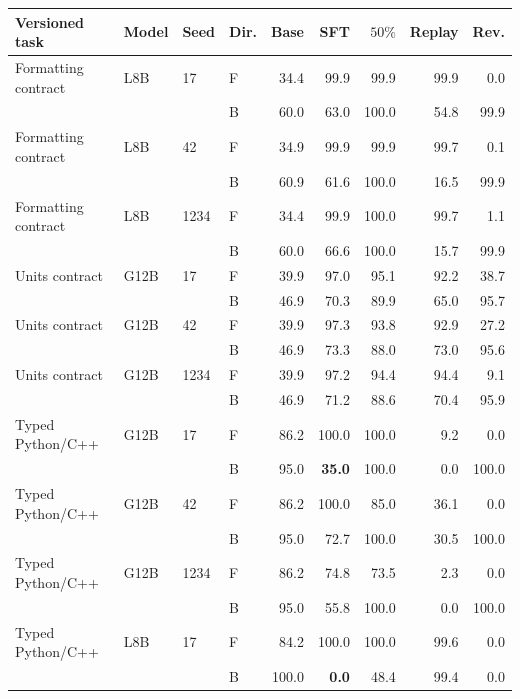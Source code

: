 \begin{table}[t]
\centering\footnotesize
\setlength{\tabcolsep}{5pt}
\begin{tabular}{lll lrrrrr}
\toprule
Versioned task & Model & Seed & Dir. & Base & SFT & $50\%$ & Replay & Rev. \\
\midrule
Formatting contract & L8B & 17 & F & 34.4 & 99.9 & 99.9 & 99.9 & 0.0 \\
 &  &  & B & 60.0 & 63.0 & 100.0 & 54.8 & 99.9 \\
\addlinespace[2pt]
Formatting contract & L8B & 42 & F & 34.9 & 99.9 & 99.9 & 99.7 & 0.1 \\
 &  &  & B & 60.9 & 61.6 & 100.0 & 16.5 & 99.9 \\
\addlinespace[2pt]
Formatting contract & L8B & 1234 & F & 34.4 & 99.9 & 100.0 & 99.7 & 1.1 \\
 &  &  & B & 60.0 & 66.6 & 100.0 & 15.7 & 99.9 \\
\addlinespace[2pt]
Units contract & G12B & 17 & F & 39.9 & 97.0 & 95.1 & 92.2 & 38.7 \\
 &  &  & B & 46.9 & 70.3 & 89.9 & 65.0 & 95.7 \\
\addlinespace[2pt]
Units contract & G12B & 42 & F & 39.9 & 97.3 & 93.8 & 92.9 & 27.2 \\
 &  &  & B & 46.9 & 73.3 & 88.0 & 73.0 & 95.6 \\
\addlinespace[2pt]
Units contract & G12B & 1234 & F & 39.9 & 97.2 & 94.4 & 94.4 & 9.1 \\
 &  &  & B & 46.9 & 71.2 & 88.6 & 70.4 & 95.9 \\
\addlinespace[2pt]
Typed Python/C++ & G12B & 17 & F & 86.2 & 100.0 & 100.0 & 9.2 & 0.0 \\
 &  &  & B & 95.0 & \textcolor{red!70!black}{\textbf{35.0}} & 100.0 & 0.0 & 100.0 \\
\addlinespace[2pt]
Typed Python/C++ & G12B & 42 & F & 86.2 & 100.0 & 85.0 & 36.1 & 0.0 \\
 &  &  & B & 95.0 & 72.7 & 100.0 & 30.5 & 100.0 \\
\addlinespace[2pt]
Typed Python/C++ & G12B & 1234 & F & 86.2 & 74.8 & 73.5 & 2.3 & 0.0 \\
 &  &  & B & 95.0 & 55.8 & 100.0 & 0.0 & 100.0 \\
\addlinespace[2pt]
Typed Python/C++ & L8B & 17 & F & 84.2 & 100.0 & 100.0 & 99.6 & 0.0 \\
 &  &  & B & 100.0 & \textcolor{red!70!black}{\textbf{0.0}} & 48.4 & 99.4 & 0.0 \\

\end{tabular}
\end{table}
